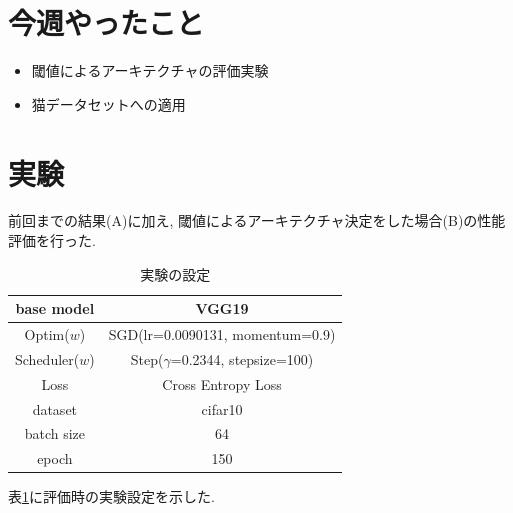 \documentclass[twocolumn]{jarticle}     %
\begin{document}


\section{今週やったこと}
\begin{itemize}
  \item 閾値によるアーキテクチャの評価実験
  \item 猫データセットへの適用
\end{itemize}

\section{実験}

前回までの結果(A)に加え, 閾値によるアーキテクチャ決定をした場合(B)の性能評価を行った.

\begin{table}[tb]
  \begin{center}
    \caption{実験の設定}
    \begin{tabular}{|c|c|} \hline
      base model & VGG19 \\ \hline
      Optim($w$) & SGD(lr=0.0090131, momentum=0.9) \\ \hline
      Scheduler($w$) & Step($\gamma$=0.2344, stepsize=100) \\ \hline
      Loss & Cross Entropy Loss \\ \hline
      dataset & cifar10 \\ \hline
      batch size & 64 \\ \hline
      epoch & 150 \\ \hline
    \end{tabular}
    \label{tab:setting}
  \end{center}
\end{table}

表\ref{tab:setting}に評価時の実験設定を示した.
\end{document}
